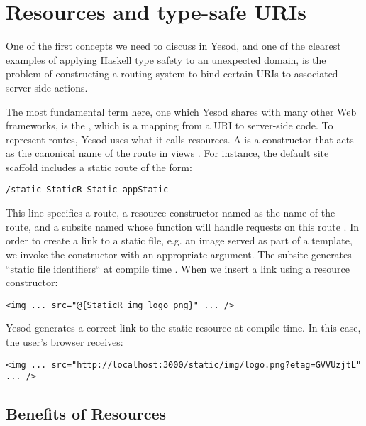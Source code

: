 \section{Resources and type-safe URIs} \label{resourcesAndTSURIs}

One of the first concepts we need to discuss in Yesod, and one of the clearest examples of applying Haskell type safety to an unexpected domain, is the problem of constructing a routing system to bind certain URIs to associated server-side actions.

The most fundamental term here, one which Yesod shares with many other Web frameworks, is the , which is a mapping from a URI to server-side code. To represent routes, Yesod uses what it calls resources. A  is a  constructor that acts as the canonical name of the route in views \cite{ybk}. For instance, the default site scaffold includes a static route of the form:

\begin{Verbatim}
/static StaticR Static appStatic
\end{Verbatim}

This line specifies a  route, a resource constructor named  as the name of the route, and a subsite named  whose function  will handle requests on this route \cite{ybkRouting}. In order to create a link to a static file, e.g. an image served as part of a template, we invoke the  constructor with an appropriate argument. The  subsite generates ``static file identifiers`` at compile time \cite{ybkScaffolding}. When we insert a link using a resource constructor:

\begin{Verbatim}
<img ... src="@{StaticR img_logo_png}" ... />
\end{Verbatim}

Yesod generates a correct link to the static resource at compile-time. In this case, the user's browser receives:

\begin{Verbatim}
<img ... src="http://localhost:3000/static/img/logo.png?etag=GVVUzjtL" ... />
\end{Verbatim}

\subsection{Benefits of Resources}

